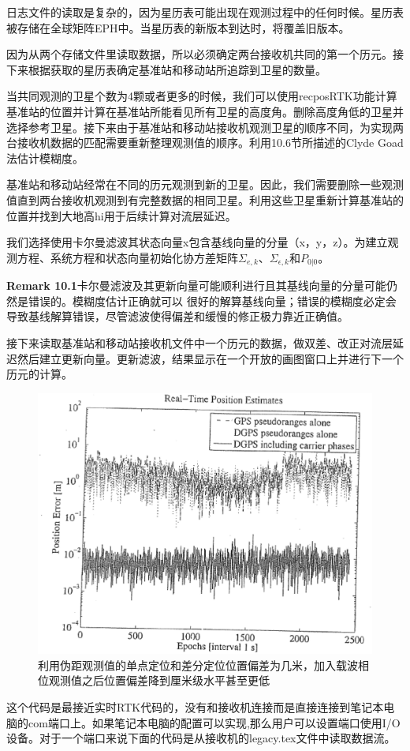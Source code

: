 日志文件的读取是复杂的，因为星历表可能出现在观测过程中的任何时候。星历表被存储在全球矩阵EPH中。当星历表的新版本到达时，将覆盖旧版本。

因为从两个存储文件里读取数据，所以必须确定两台接收机共同的第一个历元。接下来根据获取的星历表确定基准站和移动站所追踪到卫星的数量。

当共同观测的卫星个数为4颗或者更多的时候，我们可以使用recposRTK功能计算基准站的位置并计算在基准站所能看见所有卫星的高度角。删除高度角低的卫星并选择参考卫星。接下来由于基准站和移动站接收机观测卫星的顺序不同，为实现两台接收机数据的匹配需要重新整理观测值的顺序。利用10.6节所描述的Clyde Goad法估计模糊度。

基准站和移动站经常在不同的历元观测到新的卫星。因此，我们需要删除一些观测值直到两台接收机观测到有完整数据的相同卫星。利用这些卫星重新计算基准站的位置并找到大地高hi用于后续计算对流层延迟。

我们选择使用卡尔曼滤波其状态向量x包含基线向量的分量（x，y，z）。为建立观测方程、系统方程和状态向量初始化协方差矩阵$\Sigma_{e,k}$、$\Sigma_{\epsilon,k}$和$P_{0|0}$。

\textbf{Remark 10.1}卡尔曼滤波及其更新向量可能顺利进行且其基线向量的分量可能仍然是错误的。模糊度估计正确就可以
很好的解算基线向量；错误的模糊度必定会导致基线解算错误，尽管滤波使得偏差和缓慢的修正极力靠近正确值。

接下来读取基准站和移动站接收机文件中一个历元的数据，做双差、改正对流层延迟然后建立更新向量。更新滤波，结果显示在一个开放的画图窗口上并进行下一个历元的计算。

\begin{figure}
	\centering
	\includegraphics[width=0.4\linewidth]{TeX_files/Part03/chapter10/image/9-5}
	\caption{利用伪距观测值的单点定位和差分定位位置偏差为几米，加入载波相位观测值之后位置偏差降到厘米级水平甚至更低}
	\label{fig:9-5}
\end{figure}

这个代码是最接近实时RTK代码的，没有和接收机连接而是直接连接到笔记本电脑的com端口上。如果笔记本电脑的配置可以实现,那么用户可以设置端口使用I/O设备。对于一个端口来说下面的代码是从接收机的legacy.tex文件中读取数据流。

